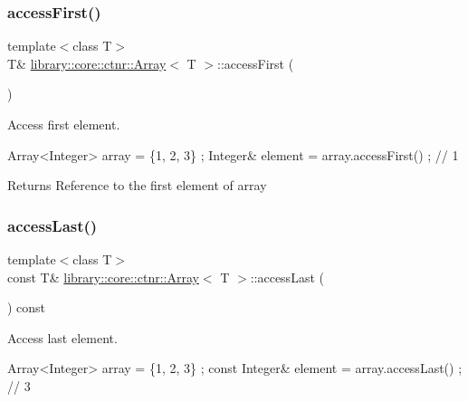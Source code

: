 \subsubsection{\texorpdfstring{access\+First()}{accessFirst()}\hspace{0.1cm}{\footnotesize\ttfamily [2/2]}}
{\footnotesize\ttfamily template$<$class T$>$ \\
T\& \hyperlink{classlibrary_1_1core_1_1ctnr_1_1_array}{library\+::core\+::ctnr\+::\+Array}$<$ T $>$\+::access\+First (\begin{DoxyParamCaption}{ }\end{DoxyParamCaption})}



Access first element. 


\begin{DoxyCode}
Array<Integer> array = \{1, 2, 3\} ;
Integer& element = array.accessFirst() ; \textcolor{comment}{// 1}
\end{DoxyCode}


\begin{DoxyReturn}{Returns}
Reference to the first element of array 
\end{DoxyReturn}
\mbox{\label{classlibrary_1_1core_1_1ctnr_1_1_array_ad95dcce8ddaf163903a2327f766dbc8a}} 
\subsubsection{\texorpdfstring{access\+Last()}{accessLast()}\hspace{0.1cm}{\footnotesize\ttfamily [1/2]}}
{\footnotesize\ttfamily template$<$class T$>$ \\
const T\& \hyperlink{classlibrary_1_1core_1_1ctnr_1_1_array}{library\+::core\+::ctnr\+::\+Array}$<$ T $>$\+::access\+Last (\begin{DoxyParamCaption}{ }\end{DoxyParamCaption}) const}



Access last element. 


\begin{DoxyCode}
Array<Integer> array = \{1, 2, 3\} ;
\textcolor{keyword}{const} Integer& element = array.accessLast() ; \textcolor{comment}{// 3}
\end{DoxyCode}


